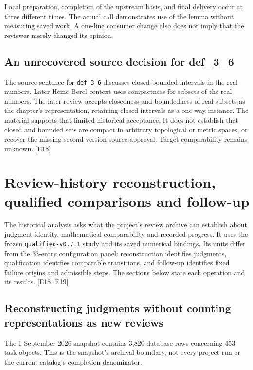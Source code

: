 Local preparation, completion of the upstream basis, and final delivery occur at three different times. The actual call demonstrates use of the lemma without measuring saved work. A one-line consumer change also does not imply that the reviewer merely changed its opinion.

\subsection[An unrecovered source decision for def\_3\_6]{\texorpdfstring{\protect\hypertarget{b11}{}An unrecovered source decision for def\_3\_6}{An unrecovered source decision for def\_3\_6}}
The source sentence for \nolinkurl{def_3_6} discusses closed bounded intervals in the real numbers. Later Heine-Borel context uses compactness for subsets of the real numbers. The later review accepts closedness and boundedness of real subsets as the chapter's representation, retaining closed intervals as a one-way instance. The material supports that limited historical acceptance. It does not establish that closed and bounded sets are compact in arbitrary topological or metric spaces, or recover the missing second-version source approval. Target comparability remains unknown. [E18]

\section[Review-history reconstruction, qualified comparisons and follow-up]{\texorpdfstring{\protect\hypertarget{appendix-c}{}Review-history reconstruction, qualified comparisons and follow-up}{Review-history reconstruction, qualified comparisons and follow-up}}
The historical analysis asks what the project's review archive can establish about judgment identity, mathematical comparability and recorded progress. It uses the frozen \nolinkurl{qualified-v0.7.1} study and its saved numerical bindings. Its units differ from the 33-entry configuration panel: reconstruction identifies judgments, qualification identifies comparable transitions, and follow-up identifies fixed failure origins and admissible steps. The sections below state each operation and its results. [E18, E19]

\subsection[Reconstructing judgments without counting representations as new reviews]{\texorpdfstring{\protect\hypertarget{c1}{}Reconstructing judgments without counting representations as new reviews}{Reconstructing judgments without counting representations as new reviews}}
The 1 September 2026 snapshot contains 3,820 database rows concerning 453 task objects. This is the snapshot's archival boundary, not every project run or the current catalog's completion denominator.

